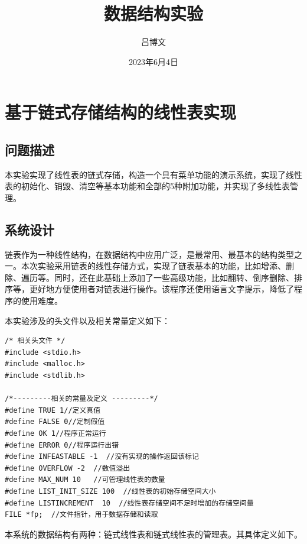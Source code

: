 \documentclass[supercite]{Experimental_Report}
\title{~~~~~~数据结构实验~~~~~~}
\author{吕博文}
\date{2023年6月4日}
\theoremstyle{definition}
\begin{document}
\maketitle


\clearpage


\tableofcontents[level=2]

\clearpage


\section{基于链式存储结构的线性表实现}


\subsection{问题描述}

本实验实现了线性表的链式存储，构造一个具有菜单功能的演示系统，实现了线性表的初始化、销毁、清空等基本功能和全部的5种附加功能，并实现了多线性表管理。

\subsection{系统设计}

链表作为一种线性结构，在数据结构中应用广泛，是最常用、最基本的结构类型之一。本次实验采用链表的线性存储方式，实现了链表基本的功能，比如增添、删除、遍历等。同时，还在此基础上添加了一些高级功能，比如翻转、倒序删除、排序等，更好地方便使用者对链表进行操作。该程序还使用语言文字提示，降低了程序的使用难度。

本实验涉及的头文件以及相关常量定义如下：
\begin{lstlisting}[title = 相关常量定义]
/* 相关头文件 */
#include <stdio.h>
#include <malloc.h>
#include <stdlib.h>

/*---------相关的常量及定义 ---------*/
#define TRUE 1//定义真值 
#define FALSE 0//定制假值 
#define OK 1//程序正常运行 
#define ERROR 0//程序运行出错 
#define INFEASTABLE -1  //没有实现的操作返回该标记
#define OVERFLOW -2  //数值溢出 
#define MAX_NUM 10   //可管理线性表的数量
#define LIST_INIT_SIZE 100  //线性表的初始存储空间大小
#define LISTINCREMENT  10  //线性表存储空间不足时增加的存储空间量
FILE *fp;  //文件指针，用于数据存储和读取
\end{lstlisting}

本系统的数据结构有两种：链式线性表和链式线性表的管理表。其具体定义如下。
\end{document}
